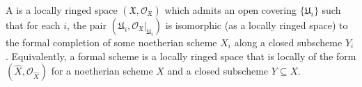 A  is a locally ringed space $(\mathfrak{X}, \mathcal{O}_{\mathfrak{X}})$ which admits an open covering $\{\mathfrak{U}_i\}$ such that for each $i$, the pair $(\mathfrak{U}_i, \mathcal{O}_{\mathfrak{X}}|_{\mathfrak{U}_i})$ is isomorphic (as a locally ringed space) to the formal completion of some noetherian scheme $X_i$ along a closed subscheme $Y_i$. Equivalently, a formal scheme is a locally ringed space that is locally of the form $(\hat{X}, \mathcal{O}_{\hat{X}})$ for a noetherian scheme $X$ and a closed subscheme $Y \subseteq X$.
